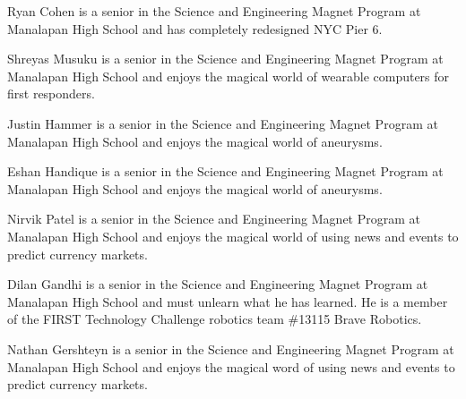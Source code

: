 \documentclass[10pt,journal,twoside]{IEEEtran}
\begin{document}
\nocite{tipler}


\vspace{0.6in}
\begin{IEEEbiography}{Ryan Cohen} is a senior in the Science and Engineering Magnet Program at Manalapan High School and has completely redesigned NYC Pier 6. 
\end{IEEEbiography}
\begin{IEEEbiography}{Shreyas Musuku} is a senior in the Science and Engineering Magnet Program at Manalapan High School and enjoys the magical world of wearable computers for first responders. 
\end{IEEEbiography}
\begin{IEEEbiography}{Justin Hammer} is a senior in the Science and Engineering Magnet Program at Manalapan High School and enjoys the magical world of aneurysms. 
\end{IEEEbiography}
\vfill
\newpage
\begin{IEEEbiography}{Eshan Handique} is a senior in the Science and Engineering Magnet Program at Manalapan High School and enjoys the magical world of aneurysms. 
\end{IEEEbiography}
\begin{IEEEbiography}{Nirvik Patel} is a senior in the Science and Engineering Magnet Program at Manalapan High School and enjoys the magical world of using news and events to predict currency markets. 
\end{IEEEbiography}
\begin{IEEEbiography}{Dilan Gandhi} is a senior in the Science and Engineering Magnet Program at Manalapan High School and must unlearn what he has learned. He is a member of the FIRST Technology Challenge robotics team \#13115 Brave Robotics.
\end{IEEEbiography}
\begin{IEEEbiography}{Nathan Gershteyn} is a senior in the Science and Engineering Magnet Program at Manalapan High School and enjoys the magical word of using news and events to predict currency markets. 
\end{IEEEbiography}
\vfill
\end{document}

